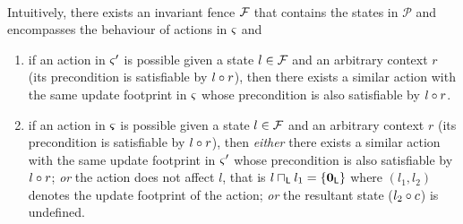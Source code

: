 \begin{definition}
\[\begin{array}{l}
\begin{array}{l}
	\end{array}
\end{array}
\]
%
Intuitively, there exists an invariant fence $\mathcal{F}_{}$ that contains the states in $\mathcal{P}$ and encompasses the behaviour of actions in $\varsigma_{}$ and 
\begin{enumerate}
	\item if an action in $\varsigma_{}'$ is possible given a state $l \in \mathcal{F}_{}$ and an arbitrary context $r$ (its precondition is satisfiable by $l \circ r$), then there exists a similar action with the same update footprint in $\varsigma_{}$ whose precondition is also satisfiable by $l \circ r$. 
	\item if an action in $\varsigma_{}$ is possible given a state $l \in \mathcal{F}_{}$ and an arbitrary context $r$ (its precondition is satisfiable by $l \circ r$), then \emph{either}  there exists a similar action with the same update footprint in $\varsigma_{}'$ whose precondition is also satisfiable by $l \circ r$; \emph{or} the action does not affect $l$, that is  $l \sqcap_{\textsf{L}} l_1 = \{\mathbf{0}_{\textsf{L}}\}$ where $(l_1, l_2)$ denotes the update footprint of the action; \emph{or}  the resultant state ($l_2 \circ c$) is undefined.
\end{enumerate} 
\end{definition}
%
%
